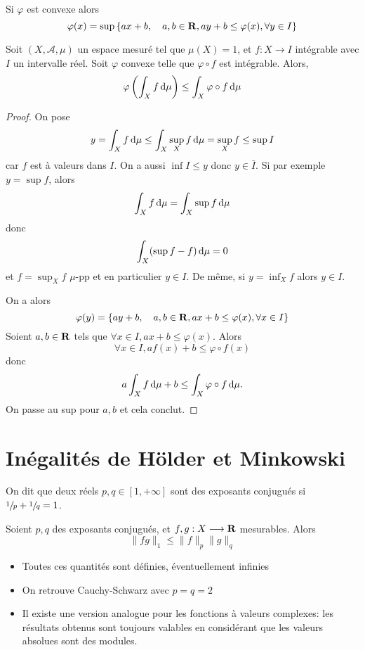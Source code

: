 \begin{prop}
Si $\varphi$ est convexe alors  \[
    \varphi(x)= \sup \left\{ ax+b, \quad  a,b \in  \mathbf R, ay+b\leq \varphi(x), \forall  y \in  I \right\} 
\] 
\end{prop}

\begin{prop}
    Soit $(X, \mathcal  A, \mu)$ un espace mesuré tel que $\mu(X)=1$, et $f:X\longrightarrow I$ intégrable avec $I$ un intervalle réel. Soit $\varphi$ convexe telle que  $\varphi\circ f$ est intégrable. Alors,  \[
        \varphi \left( \int_X f\mathop{}\!\mathrm d \mu \right) \leq  \int_X \varphi\circ f\mathop{}\!\mathrm d \mu
    \] 
\end{prop}

\begin{proof}
On pose \[
y=\int_X f\mathop{}\!\mathrm d \mu \leq \int_X \sup_Xf\mathop{}\!\mathrm d\mu=\sup_X f\leq \sup I
\] 
car $f$ est à valeurs dans  $I$. On a aussi $\inf I\leq y$ donc $y \in  \bar{I} $. Si par exemple $y=\sup f$, alors  \[
\int_X f\mathop{}\!\mathrm d\mu =\int_X \sup f\mathop{}\!\mathrm d \mu
\] 
donc \[
    \int_X(\sup f-f)\mathop{}\!\mathrm d \mu=0
\] 
et $f=\sup_X f$  $\mu$-pp et en particulier $y \in I$. De même, si $y=\inf_Xf$ alors $y \in  I$.

On a alors  \[
    \varphi(y)=\left\{ ay+b, \quad  a, b \in  \mathbf R, ax+b \leq \varphi(x), \forall  x \in  I \right\} 
\]
Soient $a, b \in  \mathbf R$ tels que $\forall  x \in  I, ax+b\leq \varphi(x)$. Alors \[
    \forall  x \in  I, af(x)+b\leq \varphi\circ f(x)
\] 
donc \[
    a\int_Xf\mathop{}\!\mathrm d \mu+b\leq \int_X\varphi\circ f\mathop{}\!\mathrm d \mu.
\] 
On passe au sup pour $a, b$ et cela conclut.
\end{proof}

\section{Inégalités de Hölder et Minkowski}

\begin{dfn}
    On dit que deux réels $p, q\in  [1, +\infty]$ sont des exposants conjugués si $\sfrac1p+\sfrac1q=1$.
\end{dfn}

\begin{thm}
     Soient $p, q$ des exposants conjugués, et  $f,g:X\longrightarrow \mathbf R$ mesurables. Alors \[
    \|fg\|_1 \leq \|f\|_p \|g\|_q
    \] 
\end{thm}

\begin{rem}
\begin{itemize}
    \item Toutes ces quantités sont définies, éventuellement infinies
    \item On retrouve Cauchy-Schwarz avec $p=q=2$
    \item Il existe une version analogue pour les fonctions à valeurs complexes: les résultats obtenus sont toujours valables en considérant que les valeurs absolues sont des modules.
\end{itemize}
\end{rem}


